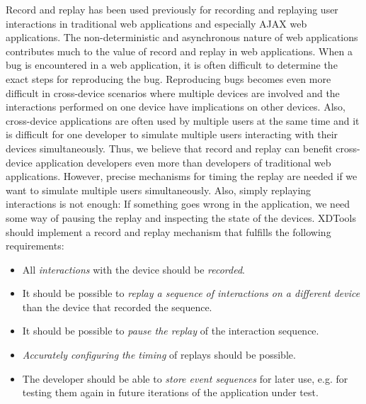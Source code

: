 Record and replay has been used previously for recording and replaying user interactions in traditional web applications and especially AJAX web applications. The non-deterministic and asynchronous nature of web applications contributes much to the value of record and replay in web applications. When a bug is encountered in a web application, it is often difficult to determine the exact steps for reproducing the bug. Reproducing bugs becomes even more difficult in cross-device scenarios where multiple devices are involved and the interactions performed on one device have implications on other devices. Also, cross-device applications are often used by multiple users at the same time and it is difficult for one developer to simulate multiple users interacting with their devices simultaneously. Thus, we believe that record and replay can benefit cross-device application developers even more than developers of traditional web applications. However, precise mechanisms for timing the replay are needed if we want to simulate multiple users simultaneously. Also, simply replaying interactions is not enough: If something goes wrong in the application, we need some way of pausing the replay and inspecting the state of the devices. XDTools should implement a record and replay mechanism that fulfills the following requirements:
\begin{itemize}
	\item All \emph{interactions} with the device should be \emph{recorded}. 
	\item It should be possible to \emph{replay a sequence of interactions on a different device} than the device that recorded the sequence.
	\item It should be possible to \emph{pause the replay} of the interaction sequence.
	\item \emph{Accurately configuring the timing} of replays should be possible.
	\item The developer should be able to \emph{store event sequences} for later use, e.g. for testing them again in future iterations of the application under test.
\end{itemize}